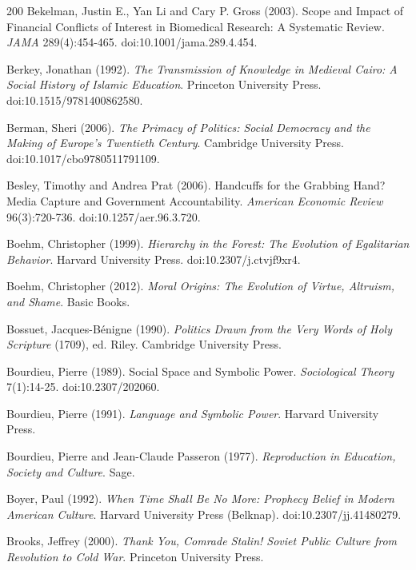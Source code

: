 \documentclass[11pt,letterpaper]{article}
\theoremstyle{definition}
\theoremstyle{remark}
\begin{document}
\begin{thebibliography}{200}
Bekelman, Justin E., Yan Li and Cary P. Gross (2003). Scope and Impact of Financial Conflicts of Interest in Biomedical Research: A Systematic Review. \emph{JAMA} 289(4):454-465. doi:10.1001/jama.289.4.454.

Berkey, Jonathan (1992). \emph{The Transmission of Knowledge in Medieval Cairo: A Social History of Islamic Education}. Princeton University Press. doi:10.1515/9781400862580.

Berman, Sheri (2006). \emph{The Primacy of Politics: Social Democracy and the Making of Europe's Twentieth Century}. Cambridge University Press. doi:10.1017/cbo9780511791109.

Besley, Timothy and Andrea Prat (2006). Handcuffs for the Grabbing Hand? Media Capture and Government Accountability. \emph{American Economic Review} 96(3):720-736. doi:10.1257/aer.96.3.720.

Boehm, Christopher (1999). \emph{Hierarchy in the Forest: The Evolution of Egalitarian Behavior}. Harvard University Press. doi:10.2307/j.ctvjf9xr4.

Boehm, Christopher (2012). \emph{Moral Origins: The Evolution of Virtue, Altruism, and Shame}. Basic Books.

Bossuet, Jacques-B\'enigne (1990). \emph{Politics Drawn from the Very Words of Holy Scripture} (1709), ed. Riley. Cambridge University Press.

Bourdieu, Pierre (1989). Social Space and Symbolic Power. \emph{Sociological Theory} 7(1):14-25. doi:10.2307/202060.

Bourdieu, Pierre (1991). \emph{Language and Symbolic Power}. Harvard University Press.

Bourdieu, Pierre and Jean-Claude Passeron (1977). \emph{Reproduction in Education, Society and Culture}. Sage.

Boyer, Paul (1992). \emph{When Time Shall Be No More: Prophecy Belief in Modern American Culture}. Harvard University Press (Belknap). doi:10.2307/jj.41480279.

Brooks, Jeffrey (2000). \emph{Thank You, Comrade Stalin! Soviet Public Culture from Revolution to Cold War}. Princeton University Press.


\end{thebibliography}
\end{document}
